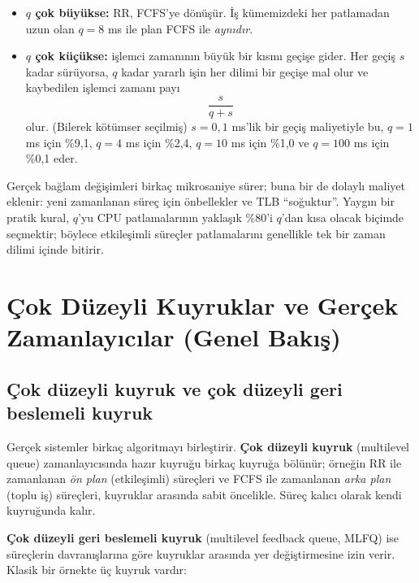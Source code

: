 \documentclass[11pt,a4paper]{article}
\newcommand{\term}[1]{\textbf{\color{mintdeep}#1}}
\begin{document}
\begin{itemize}
  \item \textbf{$q$ çok büyükse:} RR, FCFS'ye dönüşür. İş kümemizdeki her patlamadan uzun olan $q = 8$ ms ile plan FCFS ile \emph{aynıdır}.
  \item \textbf{$q$ çok küçükse:} işlemci zamanının büyük bir kısmı geçişe gider. Her geçiş $s$ kadar sürüyorsa, $q$ kadar yararlı işin her dilimi bir geçişe mal olur ve kaybedilen işlemci zamanı payı
\[
\frac{s}{q+s}
\]
olur. (Bilerek kötümser seçilmiş) $s=0{,}1$ ms'lik bir geçiş maliyetiyle bu, $q=1$ ms için \%9,1, $q=4$ ms için \%2,4, $q=10$ ms için \%1,0 ve $q=100$ ms için \%0,1 eder.
\end{itemize}

Gerçek bağlam değişimleri birkaç mikrosaniye sürer; buna bir de dolaylı maliyet eklenir: yeni zamanlanan süreç için önbellekler ve TLB ``soğuktur''. Yaygın bir pratik kural, $q$'yu CPU patlamalarının yaklaşık \%80'i $q$'dan kısa olacak biçimde seçmektir; böylece etkileşimli süreçler patlamalarını genellikle tek bir zaman dilimi içinde bitirir.

\section{Çok Düzeyli Kuyruklar ve Gerçek Zamanlayıcılar (Genel Bakış)}

\subsection{Çok düzeyli kuyruk ve çok düzeyli geri beslemeli kuyruk}

Gerçek sistemler birkaç algoritmayı birleştirir. \term{Çok düzeyli kuyruk} (multilevel queue) zamanlayıcısında hazır kuyruğu birkaç kuyruğa bölünür; örneğin RR ile zamanlanan \emph{ön plan} (etkileşimli) süreçleri ve FCFS ile zamanlanan \emph{arka plan} (toplu iş) süreçleri, kuyruklar arasında sabit öncelikle. Süreç kalıcı olarak kendi kuyruğunda kalır.

\term{Çok düzeyli geri beslemeli kuyruk} (multilevel feedback queue, MLFQ) ise süreçlerin davranışlarına göre kuyruklar arasında yer değiştirmesine izin verir. Klasik bir örnekte üç kuyruk vardır:
\end{document}

